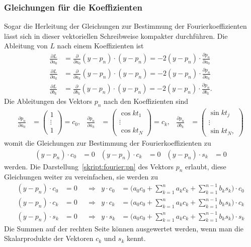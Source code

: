 \subsubsection{Gleichungen für die Koeffizienten}
Sogar die Herleitung der Gleichungen zur Bestimmung der Fourierkoeffizienten
lässt sich in dieser vektoriellen Schreibweise kompakter durchführen.
Die Ableitung von $L$ nach einem Koeffizienten ist
\begin{align*}
\frac{\partial L}{\partial a_0}
&=
\frac{\partial}{\partial a_0} (y-p_n)\cdot (y-p_n)
=
-2(y-p_n)\cdot \frac{\partial p_n}{\partial a_0}
\\
\frac{\partial L}{\partial a_k}
&=
\frac{\partial}{\partial a_k} (y-p_n)\cdot (y-p_n)
=
-2(y-p_n)\cdot \frac{\partial p_n}{\partial a_k}
\\
\frac{\partial L}{\partial b_k}
&=
\frac{\partial}{\partial b_k} (y-p_n)\cdot (y-p_n)
=
-2(y-p_n)\cdot \frac{\partial p_n}{\partial b_k}.
\end{align*}
Die Ableitungen des Vektors $p_n$ nach den Koeffizienten sind
\begin{align*}
\frac{\partial p_n}{\partial a_0}
&=
\begin{pmatrix}
1\\
\vdots\\
1
\end{pmatrix}
=
c_0,&
\frac{\partial p_n}{\partial a_k}
&=
\begin{pmatrix}
\cos kt_1\\\vdots\\\cos kt_N
\end{pmatrix} = c_k,
&
\frac{\partial p_n}{\partial b_k}
&=
\begin{pmatrix}
\sin kt_j\\\vdots\\\sin kt_N,
\end{pmatrix}
\end{align*}
womit die Gleichungen zur Bestimmung der Fourierkoeffizienten zu
\begin{align*}
(y-p_n)\cdot c_0 &= 0&
(y-p_n)\cdot c_k &= 0&
(y-p_n)\cdot s_k &= 0
\end{align*}
werden.
Die Darstellung~\eqref{skript:fourier:pn} des Vektors $p_n$ erlaubt,
diese Gleichungen weiter zu vereinfachen, sie werden zu
\begin{equation}
\begin{aligned}
(y-p_n)\cdot c_0&=0 
&&\Rightarrow&
y\cdot c_0
&=
\biggl(a_0c_0 + \sum_{k=1}^n a_kc_k +\sum_{k=1}^{n-1}b_ks_k\biggr)\cdot c_0
\\
(y-p_n)\cdot c_k&=0 
&&\Rightarrow&
y\cdot c_k
&=
\biggl(a_0c_0 + \sum_{k=1}^n a_kc_k +\sum_{k=1}^{n-1}b_ks_k\biggr)\cdot c_k
\\
(y-p_n)\cdot s_k&=0 
&&\Rightarrow&
y\cdot s_k
&=
\biggl(a_0c_0 + \sum_{k=1}^n a_kc_k +\sum_{k=1}^{n-1}b_ks_k\biggr)\cdot s_k
\end{aligned}
\label{skript:fourier:skalarprodgl}
\end{equation}
Die Summen auf der rechten Seite können ausgewertet werden, wenn man
die Skalarprodukte der Vektoren $c_k$ und $s_k$ kennt.

